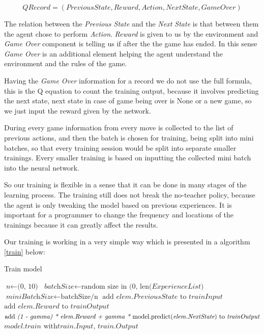 \documentclass[]{article}
\begin{document}
\begin{equation}
QRecord = (Previous State, Reward, Action, Next State, Game Over)
\end{equation}

\par The relation between the \textit{Previous State} and the \textit{Next State} is that between them the agent chose to perform \textit{Action}. \textit{Reward} is given to us by the environment and \textit{Game Over} component is telling us if after the  the game has ended. In this sense \textit{Game Over} is an additional element helping the agent understand the environment and the rules of the game. 

\par Having the \textit{Game Over} information for a record we do not use the full formula, this is the Q equation to count the training output, because it involves predicting the next state, next state in case of game being over is None or a new game, so we just input the reward given by the network.

\par During every game information from every move is collected to the list of previous actions, and then the batch is chosen for training, being split into mini batches, so that every training session would be split into separate smaller trainings. Every smaller training is based on inputting the collected mini batch into the neural network. 

\par So our training is flexible in a sense that it can be done in many stages of the learning process. The training still does not break the no-teacher policy, because the agent is only tweaking the model based on previous experiences. It is important for a programmer to change the frequency and locations of the trainings because it can greatly affect the results. 

\newpage

\par Our training is working in a very simple way which is presented in a algorithm \ref{train} below:

\begin{algorithm}
	\caption{Train model}\label{train}
	\begin{algorithmic}
		\State  $\textit{n} \gets \text{(0, 10)}$
		\State $\textit{batchSize} \gets \text{random size in (0, len(} \textit{ExperienceList} \text{)}$	
		\State $\textit{miniBatchSize} \gets \text{batchSize/n}$
		\State $\text{add }\textit{elem.PreviousState} \text{ to } \textit{trainInput}$
		\State $\text{add }\textit{elem.Reward} \text{ to } \textit{trainOutput}$
		\Else
		\State $\text{add } \textit{(1 - gamma) * elem.Reward + gamma *} \newline \text{ model.predict(} \textit{elem.NextState} \text{) to } \textit{trainOutput}$
		\EndIf
		\EndFor
		\EndFor
		\State $\textit{model.train} \text{ with} \textit{train.Input, train.Output}$
		\EndProcedure
	\end{algorithmic}
\end{algorithm}
 
\end{document}
